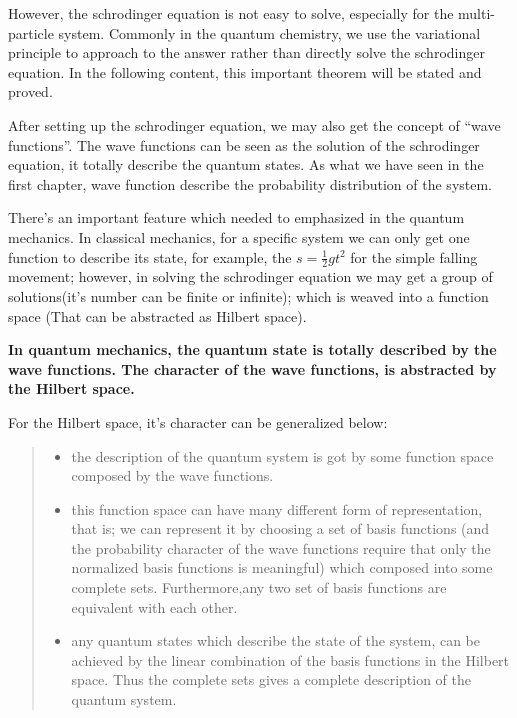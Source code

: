 However, the schrodinger equation is not easy to solve, especially
for the multi-particle system. Commonly in the quantum chemistry, we
use the variational principle to approach to the answer rather than
directly solve the schrodinger equation. In the following content,
this important theorem will be stated and proved.

After setting up the schrodinger equation, we may also get the
concept of ``wave functions''. The wave functions can be seen as the
solution of the schrodinger equation, it totally describe the
quantum states. As what we have seen in the first chapter, wave
function describe the probability distribution of the system.

There's an important feature which needed to emphasized in the
quantum mechanics. In classical mechanics, for a specific system we
can only get one function to describe its state, for example, the $s
= \frac{1}{2}gt^{2}$ for the simple falling movement; however, in
solving the schrodinger equation we may get a group of
solutions(it's number can be finite or infinite); which is weaved
into a function space (That can be abstracted as Hilbert space).

\begin{law}
\textbf{In quantum mechanics, the quantum state is totally described
by the wave functions. The character of the wave functions, is
abstracted by the Hilbert space.}
\end{law}

For the Hilbert space, it's character can be generalized below:
\begin{quote}
  \begin{center}
    \begin{itemize}
    \item the description of the quantum system is got by some
      function space composed by the wave functions.
    \item this function space can have many different form of
      representation, that is; we can represent it by choosing a set
      of basis functions (and the probability character of the wave
      functions require that only the normalized basis functions is
      meaningful) which composed into some complete
      sets. Furthermore,any two set of basis functions are equivalent
      with each other.
    \item any quantum states which describe the state of the system,
      can be achieved by the linear combination of the basis functions
      in the Hilbert space. Thus the complete sets gives a complete
      description of the quantum system.
    \end{itemize}
  \end{center}
\end{quote}

